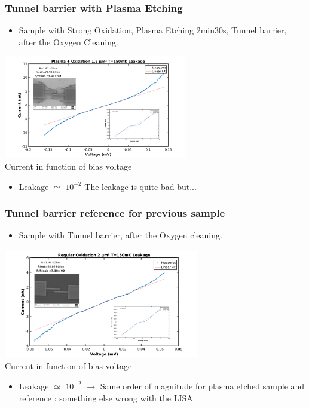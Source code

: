 \documentclass[handout]{beamer}
\begin{document}
        \begin{frame}
        \frametitle{Tunnel barrier with Plasma Etching}
        \begin{itemize}
            \item Sample with Strong Oxidation, Plasma Etching 2min30s, Tunnel barrier, after the Oxygen Cleaning.
        \end{itemize}
        
        \centering\includegraphics[width=80mm]{PlasmaOx.png}\\
        \centering Current in function of bias voltage
        
        \begin{itemize}
            \item Leakage $\simeq$ $10^{-2}$ The leakage is quite bad but...
        \end{itemize}   
    
    \end{frame}
    
    \begin{frame}
    \frametitle{Tunnel barrier reference for previous sample}
        \begin{itemize}
            \item Sample with Tunnel barrier, after the Oxygen cleaning.
        \end{itemize}
        \centering\includegraphics[width=85mm]{RegularOxRef.png}\\
        \centering Current in function of bias voltage
        
        \begin{itemize}
            \item Leakage $\simeq$ $10^{-2}$ $\rightarrow$ Same order of magnitude for plasma etched sample and reference : something else wrong with the LISA
        \end{itemize}

    \end{frame}
\end{document}
